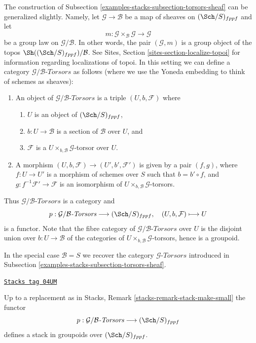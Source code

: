 The construction of
Subsection \ref{examples-stacks-subsection-torsors-sheaf}
can be generalized slightly.
Namely, let $\mathcal{G} \to \mathcal{B}$ be a map of sheaves
on $(\Sch/S)_{fppf}$ and let
$$
m :
\mathcal{G} \times_\mathcal{B} \mathcal{G}
\longrightarrow
\mathcal{G}
$$
be a group law on $\mathcal{G}/\mathcal{B}$. In other words, the pair
$(\mathcal{G}, m)$ is a group object of the topos
$\Sh((\Sch/S)_{fppf})/\mathcal{B}$. See
Sites, Section \ref{sites-section-localize-topoi}
for information regarding localizations of topoi.
In this setting we can define a category
$\mathcal{G}/\mathcal{B}\textit{-Torsors}$ as follows
(where we use the Yoneda embedding to think of schemes as sheaves):
\begin{enumerate}
\item An object of $\mathcal{G}/\mathcal{B}\textit{-Torsors}$ is a triple
$(U, b, \mathcal{F})$ where
\begin{enumerate}
\item $U$ is an object of $(\Sch/S)_{fppf}$,
\item $b : U \to \mathcal{B}$ is a section of $\mathcal{B}$ over $U$, and
\item $\mathcal{F}$ is a $U \times_{b, \mathcal{B}}\mathcal{G}$-torsor
over $U$.
\end{enumerate}
\item A morphism $(U, b, \mathcal{F}) \to (U', b', \mathcal{F}')$ is given
by a pair $(f, g)$, where $f : U \to U'$ is a morphism of schemes
over $S$ such that $b = b' \circ f$, and
$g : f^{-1}\mathcal{F}' \to \mathcal{F}$ is an
isomorphism of $U \times_{b, \mathcal{B}} \mathcal{G}$-torsors.
\end{enumerate}
Thus $\mathcal{G}/\mathcal{B}\textit{-Torsors}$ is a category and
$$
p :
\mathcal{G}/\mathcal{B}\textit{-Torsors}
\longrightarrow
(\Sch/S)_{fppf},
\quad
(U, b, \mathcal{F}) \longmapsto U
$$
is a functor. Note that the fibre category of
$\mathcal{G}/\mathcal{B}\textit{-Torsors}$
over $U$ is the disjoint union over $b : U \to \mathcal{B}$
of the categories of $U \times_{b, \mathcal{B}} \mathcal{G}$-torsors,
hence is a groupoid.

\medskip\noindent
In the special case $\mathcal{B} = S$ we recover the category
$\mathcal{G}\textit{-Torsors}$ introduced in
Subsection \ref{examples-stacks-subsection-torsors-sheaf}.

\begin{lemma}
\label{examples-stacks-lemma-variant-torsors-sheaf-stack-in-groupoids}
\href{https://stacks.math.columbia.edu/tag/04UM}{\texttt{Stacks tag 04UM}}

Up to a replacement as in
Stacks, Remark \ref{stacks-remark-stack-make-small}
the functor
$$
p :
\mathcal{G}/\mathcal{B}\textit{-Torsors}
\longrightarrow
(\Sch/S)_{fppf}
$$
defines a stack in groupoids over $(\Sch/S)_{fppf}$.
\end{lemma}

